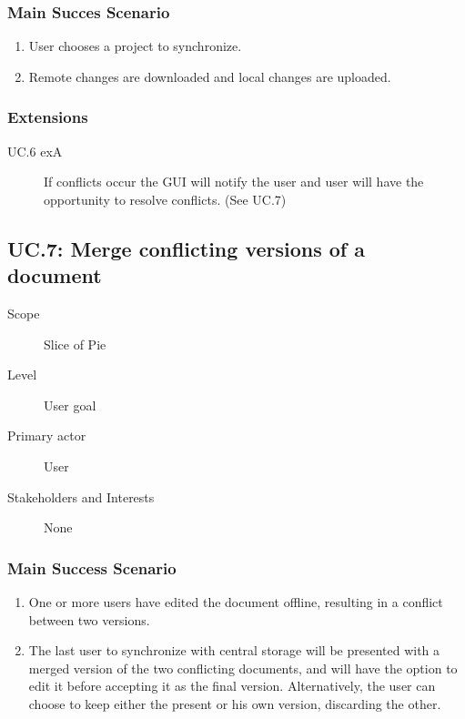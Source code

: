\subsubsection{Main Succes Scenario}
\begin{enumerate}
    \item User chooses a project to synchronize.
    \item Remote changes are downloaded and local changes are uploaded.
\end{enumerate}
    
\subsubsection{Extensions}
\begin{description}
    \item[UC.6 exA] If conflicts occur the GUI will notify the user and user will have the opportunity to resolve conflicts. (See UC.7)
\end{description}
    
\subsection{UC.7: Merge conflicting versions of a document}
\begin{description}
    \item[Scope] Slice of Pie
    \item[Level] User goal
    \item[Primary actor] User
    \item[Stakeholders and Interests] None
\end{description}
    
\subsubsection{Main Success Scenario}
\begin{enumerate}
    \item One or more users have edited the document offline, resulting in a conflict between two versions.
    \item The last user to synchronize with central storage will be presented with a merged version of the two conflicting documents, and will have the option to edit it before accepting it as the final version. Alternatively, the user can choose to keep either the present or his own version, discarding the other.
\end{enumerate}